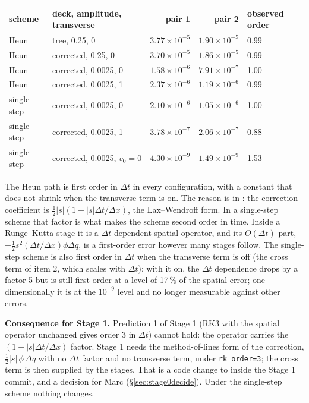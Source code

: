 \documentclass[11pt,a4paper]{article}
\newcommand{\code}[1]{\texttt{\small #1}}
\begin{document}
\begin{center}
\small
\begin{tabular}{llrrl}
\toprule
scheme & deck, amplitude, transverse & pair 1 & pair 2 & observed order \\
\midrule
Heun & tree, 0.25, 0 & $3.77\times10^{-5}$ & $1.90\times10^{-5}$ & 0.99 \\
Heun & corrected, 0.25, 0 & $3.70\times10^{-5}$ & $1.86\times10^{-5}$ & 0.99 \\
Heun & corrected, 0.0025, 0 & $1.58\times10^{-6}$ & $7.91\times10^{-7}$ & 1.00 \\
Heun & corrected, 0.0025, 1 & $2.37\times10^{-6}$ & $1.19\times10^{-6}$ & 0.99 \\
single step & corrected, 0.0025, 0 & $2.10\times10^{-6}$ & $1.05\times10^{-6}$ & 1.00 \\
single step & corrected, 0.0025, 1 & $3.78\times10^{-7}$ & $2.06\times10^{-7}$ & 0.88 \\
single step & corrected, 0.0025, $v_0 = 0$ & $4.30\times10^{-9}$ & $1.49\times10^{-9}$ & 1.53 \\
\bottomrule
\end{tabular}
\end{center}

The Heun path is first order in $\Delta t$ in every configuration, with a
constant that does not shrink when the transverse term is on.  The reason
is in : the correction coefficient is
$\tfrac12 |s| (1 - |s|\Delta t/\Delta x)$, the Lax--Wendroff form.  In a
single-step scheme that factor is what makes the scheme second order in
time.  Inside a Runge--Kutta stage it is a $\Delta t$-dependent spatial
operator, and its $O(\Delta t)$ part, $-\tfrac12 s^2 (\Delta t/\Delta x)\phi\Delta q$,
is a first-order error however many stages follow.  The single-step scheme
is also first order in $\Delta t$ when the transverse term is off (the
cross term of item 2, which scales with $\Delta t$); with it on, the
$\Delta t$ dependence drops by a factor 5 but is still first order at a
level of 17\,\% of the spatial error; one-dimensionally it is at the
$10^{-9}$ level and no longer measurable against other errors.

\textbf{Consequence for Stage 1.}  Prediction 1 of Stage 1 (RK3 with the
spatial operator unchanged gives order 3 in $\Delta t$) cannot hold: the
operator carries the $(1 - |s|\Delta t/\Delta x)$ factor.  Stage 1 needs
the method-of-lines form of the correction, $\tfrac12 |s|\,\phi\,\Delta q$
with no $\Delta t$ factor and no transverse term, under \code{rk\_order=3};
the cross term is then supplied by the stages.  That is a code change to
 inside the Stage 1 commit, and a decision for Marc
(\S\ref{sec:stage0decide}).  Under the single-step scheme nothing changes.
\end{document}
